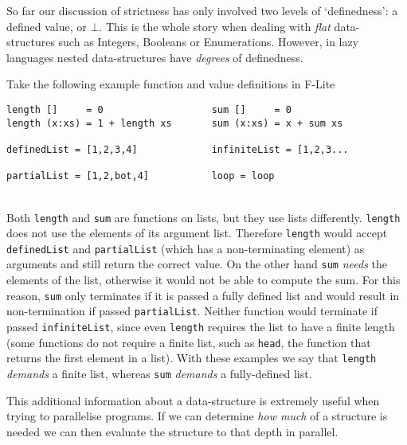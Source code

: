 So far our discussion of strictness has only involved two levels of
`definedness': a defined value, or $\bot$. This is the whole story when dealing
with \emph{flat} data-structures such as Integers, Booleans or Enumerations.
However, in lazy languages nested data-structures have \emph{degrees} of
definedness.

Take the following example function and value definitions in F-Lite

\begin{centering}
\begin{BVerbatim}
length []     = 0                   sum []     = 0
length (x:xs) = 1 + length xs       sum (x:xs) = x + sum xs

definedList = [1,2,3,4]             infiniteList = [1,2,3...

partialList = [1,2,bot,4]           loop = loop
\end{BVerbatim}
\end{centering}\\

Both \verb-length- and \verb-sum- are functions on lists, but they use lists
differently. \verb-length- does not use the elements of its argument list.
Therefore \verb-length- would accept \verb-definedList- and \verb-partialList-
(which has a non-terminating element) as arguments and still return the correct
value. On the other hand \verb-sum- \emph{needs} the elements of the list,
otherwise it would not be able to compute the sum. For this reason, \verb-sum-
only terminates if it is passed a fully defined list and would result in
non-termination if passed \verb-partialList-. Neither function would terminate
if passed \verb-infiniteList-, since even \verb-length- requires the list to
have a finite length (some functions do not require a finite list, such as
\verb-head-, the function that returns the first element in a list). With
these examples we say that \verb-length- \emph{demands} a finite list, whereas
\verb-sum- \emph{demands} a fully-defined list.

This additional information about a data-structure is extremely useful when
trying to parallelise programs. If we can determine \emph{how much} of a
structure is needed we can then evaluate the structure to that depth in
parallel.


